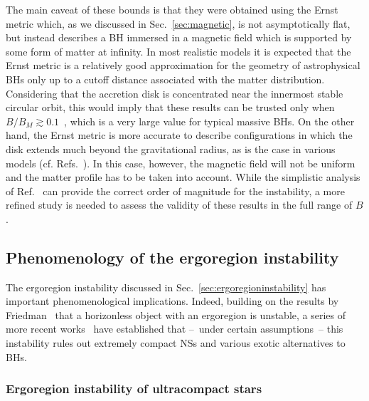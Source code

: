 \documentclass[11pt]{article}
\numberwithin{equation}{section} %
\begin{document}
The main caveat of these bounds is that they were obtained using the Ernst metric which, as we discussed in Sec.~\ref{sec:magnetic}, is not asymptotically flat, but instead describes a BH immersed in a magnetic field which is supported by some form of matter at infinity. In most realistic models it is expected that the Ernst metric is a relatively good approximation for the geometry of astrophysical BHs only up to a cutoff distance associated with the matter distribution.
Considering that the accretion disk is concentrated near the innermost stable circular orbit, this would imply that these results can be trusted only when $B/B_M\gtrsim 0.1$~\cite{Brito:2014nja}, which is a very large value for typical massive BHs. On the other hand, the Ernst metric is more accurate to describe configurations in which the disk extends much beyond the gravitational radius, as is the case in various models (cf. Refs.~\cite{lrr-2013-1,Barausse:2014tra}). In this case, however, the magnetic field will not be uniform and the matter profile has to be taken into account.  While the simplistic analysis of Ref.~\cite{Brito:2014nja} can provide the correct order of magnitude for the instability, a more refined study is needed to assess the validity of these results in the full range of $B$.

\subsection{Phenomenology of the ergoregion instability} \label{sec:ERphenom}
The ergoregion instability discussed in Sec.~\ref{sec:ergoregioninstability} has important phenomenological 
implications. Indeed, building on the results by Friedman~\cite{1978CMaPh..63..243F} that a horizonless object with an 
ergoregion is unstable, a series of more recent 
works~\cite{Cardoso:2007az,Cardoso:2008kj,Pani:2010jz,Chirenti:2008pf,Moschidis:2016zjy,Cardoso:2014sna,Maggio:2017ivp,
Maggio:2018ivz} have established that --~under certain assumptions~-- this instability rules out extremely compact NSs 
and various exotic alternatives to BHs.




\subsubsection{Ergoregion instability of ultracompact stars} \label{sec:ERphenom_stars}
\end{document}

